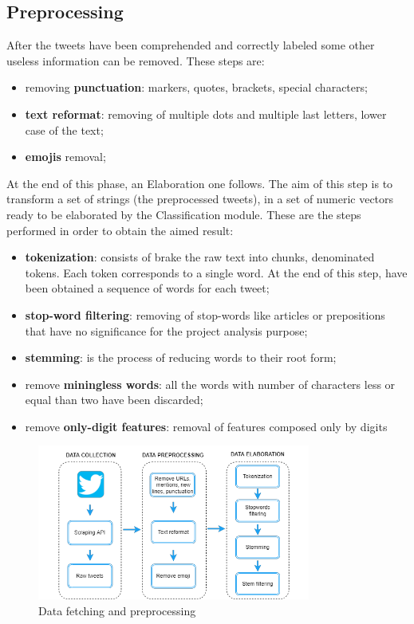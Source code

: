 \subsection{Preprocessing}

After the tweets have been comprehended and correctly labeled some other useless information can be removed. These steps are:

\begin{itemize}
\item  removing \textbf{punctuation}: markers, quotes, brackets, special characters;
\item \textbf{text reformat}: removing of multiple dots and multiple last letters, lower case of the text;
\item \textbf{emojis} removal;
\end{itemize}
At the end of this phase, an Elaboration one follows. The aim of this step is to transform a set of strings (the preprocessed tweets), in a set of numeric vectors ready to be elaborated by the Classification module. 
These are the steps performed in order to obtain the aimed result: 
\begin{itemize}
\item \textbf{tokenization}: consists of brake the raw text into chunks, denominated tokens. Each token corresponds to a single word. At the end of this step, have been obtained a sequence of words for each tweet;
\item \textbf{stop-word filtering}: removing of stop-words like articles or prepositions that have no significance for the project analysis purpose;
\item \textbf{stemming}: is the process of reducing words to their root form;
\item remove \textbf{miningless words}: all the words with number of characters less or equal than two have been discarded;
\item remove \textbf{only-digit features}: removal of features composed only by digits
\end{itemize}



\begin{figure}[H]
    \centering
    \includegraphics[width=0.8\textwidth]{images/dataset/preprocessing.png} 
    \caption{Data fetching and preprocessing} 
    \label{fig:preprocessing}
\end{figure}




